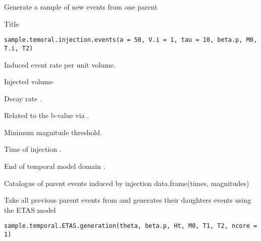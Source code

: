 \documentclass[letterpaper]{book}
\begin{document}
%
\begin{Value}
Generate a sample of new events  from one parent
\end{Value}
%
\begin{Description}\relax
Title
\end{Description}
%
\begin{Usage}
\begin{verbatim}
sample.temoral.injection.events(a = 50, V.i = 1, tau = 10, beta.p, M0, T.i, T2)
\end{verbatim}
\end{Usage}
%
\begin{Arguments}
\begin{ldescription}
\item[\code{a}] Induced event rate per unit volume.

\item[\code{V.i}] Injected volume

\item[\code{tau}] Decay rate .

\item[\code{beta.p}] Related to the b-value via .

\item[\code{M0}] Minimum magnitude threshold.

\item[\code{T.i}] Time of injection .

\item[\code{T2}] End of temporal model domain .
\end{ldescription}
\end{Arguments}
%
\begin{Value}
Catalogue of parent events induced by injection data.frame(times, magnitudes)
\end{Value}
%
\begin{Description}\relax
Take all previous parent events from  and generates their daughters events using the ETAS model
\end{Description}
%
\begin{Usage}
\begin{verbatim}
sample.temporal.ETAS.generation(theta, beta.p, Ht, M0, T1, T2, ncore = 1)
\end{verbatim}
\end{Usage}
\end{document}
